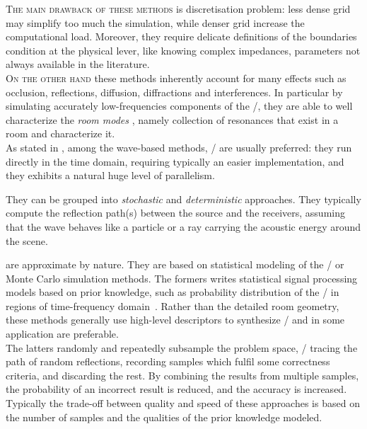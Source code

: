 \textsc{The main drawback of these methods} is discretisation problem:
less dense grid may simplify too much the simulation, while denser grid increase the computational load.
Moreover, they require delicate definitions of the boundaries condition at the physical lever,
like knowing complex impedances, parameters not always available in the literature.
\\\textsc{On the other hand} these methods inherently account for many effects such as occlusion, reflections, diffusion, diffractions and interferences.
In particular by simulating accurately low-frequencies components of the \RIR/, they are able to well characterize the \textit{room modes}
,
namely collection of resonances that exist in a room and characterize it.
\\As stated in \cite{valimaki2016more}, among the wave-based methods, \DWMf/ are usually preferred:
they run directly in the time domain, requiring typically an easier implementation, and they exhibits a natural huge level of parallelism.

They can be grouped into \textit{stochastic} and \textit{deterministic} approaches.
They typically compute the reflection path(s) between the source and the receivers,
assuming that the wave behaves like a particle or a ray carrying the acoustic energy around the scene.

 are approximate by nature.
They are based on statistical modeling of the \RIRs/ or Monte Carlo simulation methods.
The formers writes statistical signal processing models based on prior knowledge,
such as probability distribution of the \RIR/ in regions of time-frequency domain~\cite{badeau2019common}.
Rather than the detailed room geometry, these methods generally use high-level descriptors
to synthesize \RIRs/ and in some application are preferable.
\\The latters randomly and repeatedly subsample the problem space, \eg/ tracing the path of random reflections,
recording samples which fulfil some correctness criteria, and discarding the rest.
By combining the results from multiple samples, the probability of an incorrect result is reduced, and the accuracy is increased.
Typically the trade-off between quality and speed of these approaches is based on the number of samples and
the qualities of the prior knowledge modeled.

